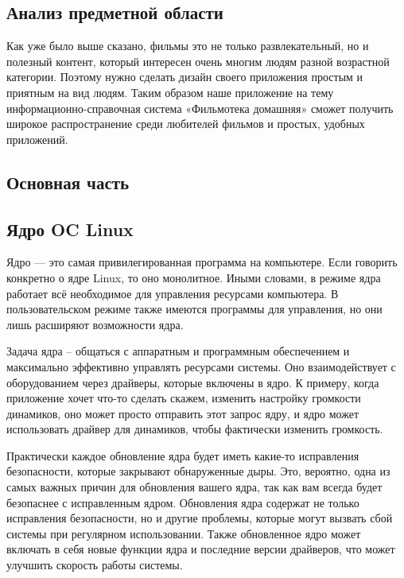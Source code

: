 \subsection{Анализ предметной области}

Как уже было выше сказано, фильмы это не только развлекательный, но и полезный контент, который интересен очень многим людям разной возрастной категории. Поэтому нужно сделать дизайн своего приложения простым и приятным на вид людям. Таким образом наше приложение на тему информационно-справочная система «Фильмотека домашняя» сможет получить широкое распространение среди любителей фильмов и простых, удобных приложений.


\setcounter{subsection}{0}
\begin{center}
\section*{Основная часть}
\end{center}
\subsection{Ядро OC Linux}
Ядро — это самая привилегированная программа на компьютере. Если говорить конкретно о ядре Linux, то оно монолитное. Иными словами, в режиме ядра работает всё необходимое для управления ресурсами компьютера. В пользовательском режиме также имеются программы для управления, но они лишь расширяют возможности ядра.

Задача ядра – общаться с аппаратным и программным обеспечением и максимально эффективно управлять ресурсами системы. Оно взаимодействует с оборудованием через драйверы, которые включены в ядро. К примеру, когда приложение хочет что-то сделать скажем, изменить настройку громкости динамиков, оно может просто отправить этот запрос ядру, и ядро может использовать драйвер для динамиков, чтобы фактически изменить громкость.

Практически каждое обновление ядра будет иметь какие-то исправления безопасности, которые закрывают обнаруженные дыры. Это, вероятно, одна из самых важных причин для обновления вашего ядра, так как вам всегда будет безопаснее с исправленным ядром. 
Обновления ядра содержат не только исправления безопасности, но и другие проблемы, которые могут вызвать сбой системы при регулярном использовании. Также обновленное ядро может включать в себя новые функции ядра и последние версии драйверов, что может улучшить скорость работы системы.

